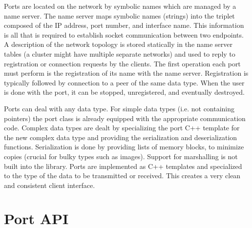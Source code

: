 
Ports are located on the network by symbolic names which are managed by a name server.
%
%
The name server maps symbolic names (strings) into the triplet 
composed of the IP address, port number, and interface name. This information is all 
that is required to establish socket communication between two endpoints. 
A description of the network topology is stored statically in the name server tables (a
cluster might have multiple separate networks) and used to reply to
registration or connection requests by the clients. The first operation each port must
perform is the registration of its name with the name server. 
%
%
Registration is typically followed by connection to a peer
of the same data type. When the user is done with the port, it can be stopped,
unregistered, and eventually destroyed.

Ports can deal with any data type. For simple data types (i.e. not containing pointers) 
the port class is already equipped with the appropriate communication code. Complex data
types are dealt by specializing the port C++ template for the 
new complex data type and providing the serialization and deserialization functions. 
Serialization is done by providing lists of memory blocks, to minimize copies (crucial
for bulky types such as images).
%
%
Support for marshalling is not built into the library.
%
%
Ports are implemented as C++ templates and 
specialized to the type of the data to be transmitted or received. This creates a very 
clean and consistent client interface.

\section{Port API}

